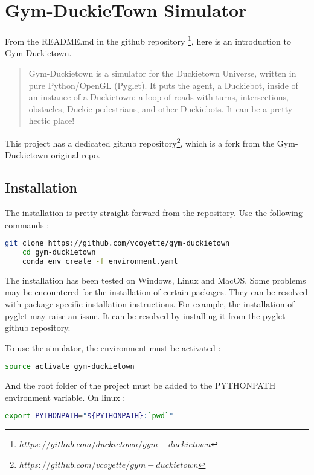 
\chapter{Gym-DuckieTown Simulator}

From the README.md in the github repository \footnote{$https://github.com/duckietown/gym-duckietown$}, here is an introduction to Gym-Duckietown.

 \begin{quotation}
Gym-Duckietown is a simulator for the Duckietown Universe, written in pure Python/OpenGL (Pyglet). It puts the agent, a Duckiebot, inside of an instance of a Duckietown: a loop of roads with turns, intersections, obstacles, Duckie pedestrians, and other Duckiebots. It can be a pretty hectic place!
 \end{quotation}

This project has a dedicated github repository\footnote{$https://github.com/vcoyette/gym-duckietown$}, which is a fork from the Gym-Duckietown original repo.

\section{Installation}
The installation is pretty straight-forward from the repository. Use the following commands :

\begin{lstlisting}[language=bash]
    git clone https://github.com/vcoyette/gym-duckietown
    cd gym-duckietown
    conda env create -f environment.yaml
\end{lstlisting}

The installation has been tested on Windows, Linux and MacOS. Some problems may be encountered for the installation of certain packages.
They can be resolved with package-specific installation instructions.
For example, the installation of pyglet may raise an issue.
It can be resolved by installing it from the pyglet github repository.

To use the simulator, the environment must be activated :

\begin{lstlisting}[language=bash]
    source activate gym-duckietown
\end{lstlisting}

And the root folder of the project must be added to the PYTHONPATH environment variable.
On linux :
\begin{lstlisting}[language=bash]
    export PYTHONPATH="${PYTHONPATH}:`pwd`"
\end{lstlisting}

